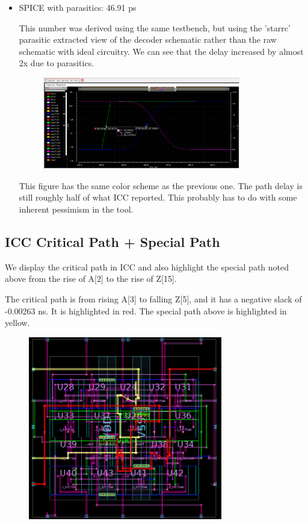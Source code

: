 \documentclass[11pt]{article}
\begin{document}
\begin{itemize}
	\item SPICE with parasitics: 46.91 ps
	
	This number was derived using the same testbench, but using the 'starrc' parasitic extracted view of the decoder schematic rather than the raw schematic with ideal circuitry. We can see that the delay increased by almost 2x due to parasitics.
	
	\begin{figure}[H]
		\centerline{\includegraphics[height=4cm]{spice_path_delay_with_parasitics.png}}
	\end{figure}

	This figure has the same color scheme as the previous one. The path delay is still roughly half of what ICC reported. This probably has to do with some inherent pessimism in the tool.
\end{itemize}

\subsection{ICC Critical Path + Special Path}
We display the critical path in ICC and also highlight the special path noted above from the rise of A[2] to the rise of Z[15].

The critical path is from rising A[3] to falling Z[5], and it has a negative slack of -0.00263 ns. It is highlighted in red. The special path above is highlighted in yellow.

\begin{figure}[H]
	\centerline{\includegraphics[height=8cm]{icc_critical_path.png}}
\end{figure}
\end{document}
